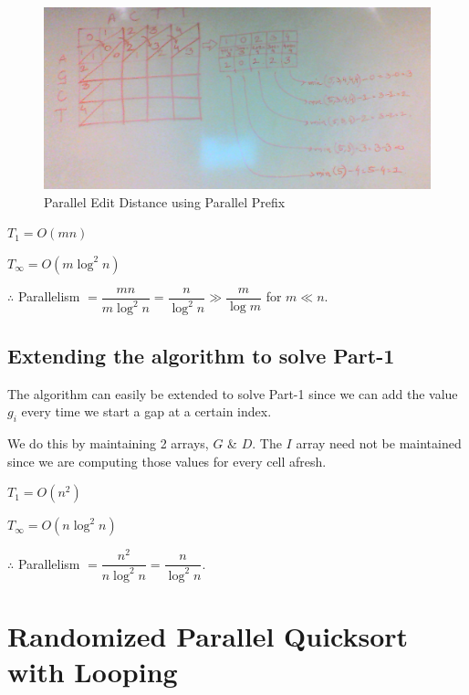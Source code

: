\documentclass{article}
\begin{document}
\begin{figure}[h!]
  \begin{center}
    \includegraphics[width=6in]{images/edit_diatance_using_parallel_prefix_small.png}
    \caption{Parallel Edit Distance using Parallel Prefix}
    \label{fig:pareditdistance}
  \end{center}
\end{figure}

\clearpage

\lstset{ language=C++, caption=Optimized parallel Edit Distance
  Computation (serial code) }


$T_1 = O(mn)$

$T_{\infty} = O(m\log^2{n})$

$\therefore$ Parallelism $= \dfrac{mn}{m\log^2{n}} = \dfrac{n}{\log^2{n}} \gg \dfrac{m}{\log{m}}$ for $m \ll n$.

\subsection{Extending the algorithm to solve Part-1}

The algorithm can easily be extended to solve Part-1 since we can add
the value $g_i$ every time we start a gap at a certain index.

We do this by maintaining 2 arrays, $G$ \& $D$. The $I$ array need not
be maintained since we are computing those values for every cell
afresh.

$T_1 = O(n^2)$

$T_{\infty} = O(n\log^2{n})$

$\therefore$ Parallelism $= \dfrac{n^2}{n\log^2{n}} = \dfrac{n}{\log^2{n}}$.

\clearpage

\section{Randomized Parallel Quicksort with Looping}
\end{document}
